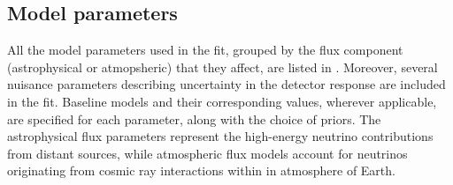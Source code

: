\subsection{Model parameters}
\label{sec:params}
All the model parameters used in the fit, grouped by the flux component (astrophysical or atmopsheric) that they affect, are listed in . Moreover, several nuisance parameters describing uncertainty in the detector response are included in the fit. Baseline models and their corresponding values, wherever applicable, are specified for each parameter, along with the choice of priors. The astrophysical flux parameters represent the high-energy neutrino contributions from distant sources, while atmospheric flux models account for neutrinos originating from cosmic ray interactions within in atmosphere of Earth. 

